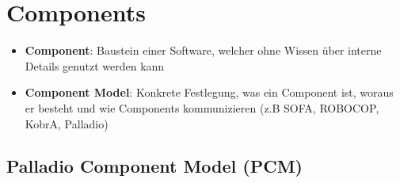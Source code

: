 \section{Components}
\label{c:sec:components}

\begin{itemize}
	\item \textbf{Component}: Baustein einer Software, welcher ohne Wissen über interne Details genutzt werden kann
	\item \textbf{Component Model}: Konkrete Festlegung, was ein Component ist, woraus er besteht und wie Components kommunizieren (z.B SOFA, ROBOCOP, KobrA, Palladio)
\end{itemize}

\subsection{Palladio Component Model (PCM)}
\label{sub:palladio_component_model}


